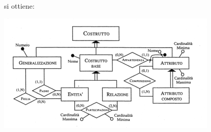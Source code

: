 \documentclass[a4paper,12pt, oneside]{book}
\begin{document}
si ottiene:
\begin{center}
\includegraphics[scale=0.8]{img/vin3.png}
\end{center}
\end{document}
